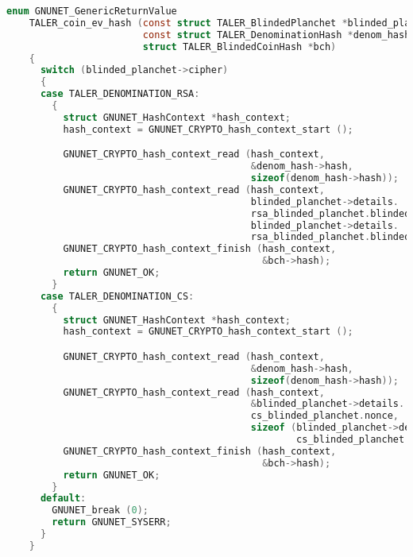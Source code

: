 \begin{lstlisting}[style=bfh-c,language=C, caption={Fixed idempotency check}, label={lst:fixed-idempotence}]
    enum GNUNET_GenericReturnValue
    TALER_coin_ev_hash (const struct TALER_BlindedPlanchet *blinded_planchet,
                        const struct TALER_DenominationHash *denom_hash,
                        struct TALER_BlindedCoinHash *bch)
    {
      switch (blinded_planchet->cipher)
      {
      case TALER_DENOMINATION_RSA:
        {
          struct GNUNET_HashContext *hash_context;
          hash_context = GNUNET_CRYPTO_hash_context_start ();

          GNUNET_CRYPTO_hash_context_read (hash_context,
                                           &denom_hash->hash,
                                           sizeof(denom_hash->hash));
          GNUNET_CRYPTO_hash_context_read (hash_context,
                                           blinded_planchet->details.
                                           rsa_blinded_planchet.blinded_msg,
                                           blinded_planchet->details.
                                           rsa_blinded_planchet.blinded_msg_size);
          GNUNET_CRYPTO_hash_context_finish (hash_context,
                                             &bch->hash);
          return GNUNET_OK;
        }
      case TALER_DENOMINATION_CS:
        {
          struct GNUNET_HashContext *hash_context;
          hash_context = GNUNET_CRYPTO_hash_context_start ();

          GNUNET_CRYPTO_hash_context_read (hash_context,
                                           &denom_hash->hash,
                                           sizeof(denom_hash->hash));
          GNUNET_CRYPTO_hash_context_read (hash_context,
                                           &blinded_planchet->details.
                                           cs_blinded_planchet.nonce,
                                           sizeof (blinded_planchet->details.
                                                   cs_blinded_planchet.nonce));
          GNUNET_CRYPTO_hash_context_finish (hash_context,
                                             &bch->hash);
          return GNUNET_OK;
        }
      default:
        GNUNET_break (0);
        return GNUNET_SYSERR;
      }
    }
\end{lstlisting}
